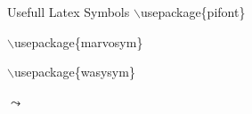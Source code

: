 \documentclass{beamer}
\begin{document}
\begin{frame}{Usefull Latex Symbols}
$\backslash$usepackage\{\alert{pifont}\}\par
{}{}{}{}{}{}
{}{}{}{}{}{}
{}{}{}{}{}{}
		
$\backslash$usepackage\{\alert{marvosym}\}\par
{\EUR}{\EURcr}{\EURdig}{\EURhv}{\EURtm}{\EyesDollar}{\Moon}{\Sun}{\Aries}
{\Cancer}{\Libra}{\Capricorn}{\Taurus}{\Leo}{\Scorpio}{\Aquarius}{\Gemini}
{\Virgo}{\Sagittarius}{\Pisces}{\Hexasteel}{\Octosteel}{\Rectpipe}
{\Rectsteel}{\Squarepipe}{\Squaresteel}{\FEMALE}{\Female}{\Male}{\MALE}
{\Biohazard}{\CEsign}{\Radioactivity}{\Stopsign}{\Forward}{\MoveDown}
{\MoveUp}{\Rewind}{\ToTop}{\ForwardToEnd}{\RewindToStart}{\ToBottom}
{\RewindToIndex}{\ForwardToIndex}{\ClockLogo}{\Coffeecup}{\PackingWaste}
{\Recycling}

$\backslash$usepackage\{\alert{wasysym}\}\par
{$\leadsto$}
{\mercury}{\earth}{\jupiter}{\uranus}{\pluto}{\venus}{\mars}{\saturn}
{\neptune}{\astrosun}{\fullmoon}{\leftmoon}{\newmoon}{\rightmoon}{\aries}
{\cancer}{\libra}{\aquarius}{\taurus}{\leo}{\scorpio}{\capricornus}
{\gemini}{\virgo}{\sagittarius}{\pisces}{\ascnode}{\descnode}{\conjunction}
{\opposition}{\vernal}{\female}{\male}{\CheckedBox}{\Square}{\XBox}
{\blacksmiley}{\smiley}
\end{frame}
\end{document}
